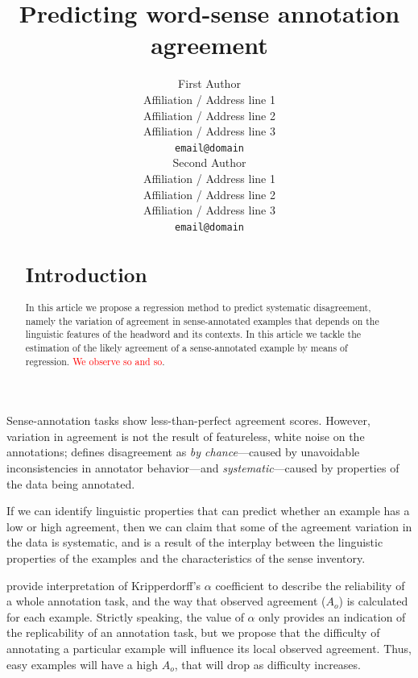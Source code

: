 \documentclass[11pt,a4paper]{article}
\title{Predicting word-sense annotation agreement}
\author{First Author \\
  Affiliation / Address line 1 \\
  Affiliation / Address line 2 \\
  Affiliation / Address line 3 \\
  {\tt email@domain} \\\And
  Second Author \\
  Affiliation / Address line 1 \\
  Affiliation / Address line 2 \\
  Affiliation / Address line 3 \\
  {\tt email@domain} \\}
\date{}
\begin{document}
\maketitle
\begin{abstract}
\section{Introduction}


In this article we propose a regression method to predict systematic disagreement, namely the variation of agreement in sense-annotated examples that depends on the linguistic features of the headword and its contexts.
 In this article we tackle the estimation of the likely agreement of a sense-annotated example by means of regression. \textcolor{red}{ We observe so and so}. 
\end{abstract}

Sense-annotation tasks show less-than-perfect agreement scores. However, variation in agreement is not the result of featureless, white noise on the annotations;  defines disagreement as \textit{by chance}---caused by unavoidable inconsistencies in annotator behavior---and \textit{systematic}---caused by properties of the data being annotated.

If we can identify linguistic properties that can predict whether an example has a low or high agreement, then we can claim that some of the agreement variation in the data is systematic, and is a result of the interplay between the linguistic properties of the examples and the characteristics of the sense inventory.



 provide interpretation of Kripperdorff's $\alpha$ coefficient to describe the reliability of a whole annotation task, and the way that observed agreement ($A_o$) is calculated for each example. Strictly speaking, the value of $\alpha$ only provides an indication of the replicability of an annotation task, but we propose that the difficulty of annotating a particular example will influence its local observed agreement. Thus, easy examples will have a high $A_o$, that will drop as difficulty increases. 


\end{document}
